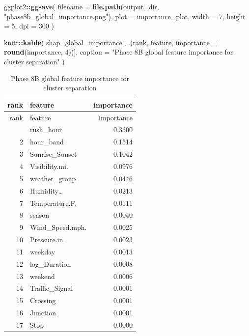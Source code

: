 \documentclass[
]{article}
\newenvironment{Shaded}{\begin{snugshade}}{\end{snugshade}}
\newcommand{\AttributeTok}[1]{\textcolor[rgb]{0.13,0.29,0.53}{#1}}
\newcommand{\DecValTok}[1]{\textcolor[rgb]{0.00,0.00,0.81}{#1}}
\newcommand{\FunctionTok}[1]{\textcolor[rgb]{0.13,0.29,0.53}{\textbf{#1}}}
\newcommand{\NormalTok}[1]{#1}
\newcommand{\SpecialCharTok}[1]{\textcolor[rgb]{0.81,0.36,0.00}{\textbf{#1}}}
\newcommand{\StringTok}[1]{\textcolor[rgb]{0.31,0.60,0.02}{#1}}
\begin{document}
\begin{Shaded}
\begin{Highlighting}[]
\NormalTok{ggplot2}\SpecialCharTok{::}\FunctionTok{ggsave}\NormalTok{(}
  \AttributeTok{filename =} \FunctionTok{file.path}\NormalTok{(output\_dir, }\StringTok{"phase8b\_global\_importance.png"}\NormalTok{),}
  \AttributeTok{plot     =}\NormalTok{ importance\_plot,}
  \AttributeTok{width    =} \DecValTok{7}\NormalTok{,}
  \AttributeTok{height   =} \DecValTok{5}\NormalTok{,}
  \AttributeTok{dpi      =} \DecValTok{300}
\NormalTok{)}

\NormalTok{knitr}\SpecialCharTok{::}\FunctionTok{kable}\NormalTok{(}
\NormalTok{  shap\_global\_importance[, .(rank, feature, }\AttributeTok{importance =} \FunctionTok{round}\NormalTok{(importance, }\DecValTok{4}\NormalTok{))],}
  \AttributeTok{caption =} \StringTok{"Phase 8B global feature importance for cluster separation"}
\NormalTok{)}
\end{Highlighting}
\end{Shaded}

\begin{longtable}[]{@{}rlr@{}}
\caption{Phase 8B global feature importance for cluster
separation}\tabularnewline
\toprule\noalign{}
rank & feature & importance \\
\midrule\noalign{}
\endfirsthead
\toprule\noalign{}
rank & feature & importance \\
\midrule\noalign{}
\endhead
\bottomrule\noalign{}
\endlastfoot
1 & rush\_hour & 0.3300 \\
2 & hour\_band & 0.1514 \\
3 & Sunrise\_Sunset & 0.1042 \\
4 & Visibility.mi. & 0.0976 \\
5 & weather\_group & 0.0446 \\
6 & Humidity\ldots{} & 0.0213 \\
7 & Temperature.F. & 0.0111 \\
8 & season & 0.0040 \\
9 & Wind\_Speed.mph. & 0.0025 \\
10 & Pressure.in. & 0.0023 \\
11 & weekday & 0.0013 \\
12 & log\_Duration & 0.0008 \\
13 & weekend & 0.0006 \\
14 & Traffic\_Signal & 0.0001 \\
15 & Crossing & 0.0001 \\
16 & Junction & 0.0001 \\
17 & Stop & 0.0000 \\
\end{longtable}
\end{document}
